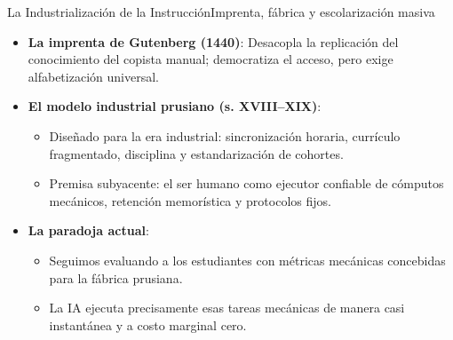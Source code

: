 \documentclass[aspectratio=169,11pt]{beamer}
\begin{document}
\begin{frame}{La Industrialización de la Instrucción}{Imprenta,
  fábrica y escolarización masiva}
\begin{itemize}\setlength{\itemsep}{0.6em}
    \item \textbf{La imprenta de Gutenberg (1440)}: Desacopla la
      replicación del conocimiento del copista manual; democratiza
      el acceso, pero exige alfabetización universal.
    \item \textbf{El modelo industrial prusiano (s. XVIII--XIX)}:
    \begin{itemize}\setlength{\itemsep}{0.3em}
        \item Diseñado para la era industrial: sincronización
          horaria, currículo fragmentado, disciplina y
          estandarización de cohortes.
        \item Premisa subyacente: el ser humano como ejecutor
          confiable de cómputos mecánicos, retención memorística y
          protocolos fijos.
      \end{itemize}
    \item \textbf{La paradoja actual}:
    \begin{itemize}\setlength{\itemsep}{0.3em}
        \item Seguimos evaluando a los estudiantes con métricas
          mecánicas concebidas para la fábrica prusiana.
        \item La IA ejecuta precisamente esas tareas mecánicas de
          manera casi instantánea y a costo marginal cero.
      \end{itemize}
  \end{itemize}
\end{frame}
\end{document}
